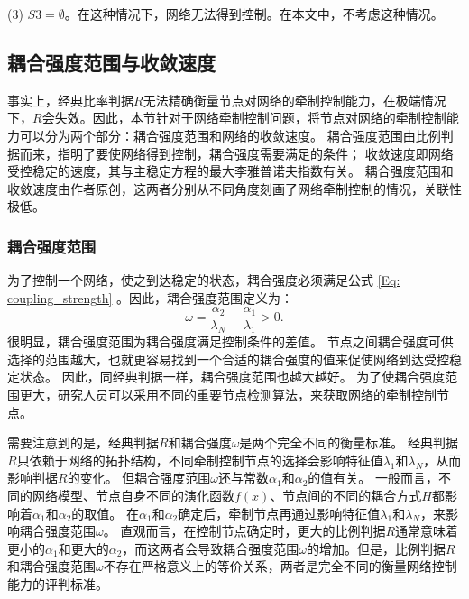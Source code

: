 (3) $ S3 = \emptyset $。在这种情况下，网络无法得到控制。在本文中，不考虑这种情况。

\subsection{耦合强度范围与收敛速度}
事实上，经典比率判据$ R $无法精确衡量节点对网络的牵制控制能力，在极端情况下，$ R $会失效。因此，本节针对于网络牵制控制问题，将节点对网络的牵制控制能力可以分为两个部分：耦合强度范围和网络的收敛速度。
耦合强度范围由比例判据而来，指明了要使网络得到控制，耦合强度需要满足的条件；
收敛速度即网络受控稳定的速度，其与主稳定方程的最大李雅普诺夫指数有关。
耦合强度范围和收敛速度由作者原创，这两者分别从不同角度刻画了网络牵制控制的情况，关联性极低。

\subsubsection{耦合强度范围}
为了控制一个网络，使之到达稳定的状态，耦合强度必须满足公式 \ref{Eq: coupling_strength} 。因此，耦合强度范围定义为：
\begin{equation}
\omega = \frac{\alpha_2}{\lambda_N} - \frac{\alpha_1}{\lambda_1} >0.
\label{Eq: omega}
\end{equation}
很明显，耦合强度范围为耦合强度满足控制条件的差值。
节点之间耦合强度可供选择的范围越大，也就更容易找到一个合适的耦合强度的值来促使网络到达受控稳定状态。
因此，同经典判据一样，耦合强度范围也越大越好。
为了使耦合强度范围更大，研究人员可以采用不同的重要节点检测算法，来获取网络的牵制控制节点。

需要注意到的是，经典判据$ R $和耦合强度$ \omega $是两个完全不同的衡量标准。
经典判据$ R $只依赖于网络的拓扑结构，不同牵制控制节点的选择会影响特征值$ \lambda_1 $和$ \lambda_N $，从而影响判据$ R $的变化。
但耦合强度范围$ \omega $还与常数$ \alpha_1 $和$ \alpha_2 $的值有关。
一般而言，不同的网络模型、节点自身不同的演化函数$ f(x) $、节点间的不同的耦合方式$ H $都影响着$ \alpha_1 $和$ \alpha_2 $的取值。
在$ \alpha_1 $和$ \alpha_2 $确定后，牵制节点再通过影响特征值$ \lambda_1 $和$ \lambda_N $，来影响耦合强度范围$ \omega $。
直观而言，在控制节点确定时，更大的比例判据$ R $通常意味着更小的$ \alpha_1 $和更大的$ \alpha_2 $，而这两者会导致耦合强度范围$ \omega $的增加。但是，比例判据$ R $和耦合强度范围$ \omega $不存在严格意义上的等价关系，两者是完全不同的衡量网络控制能力的评判标准。

